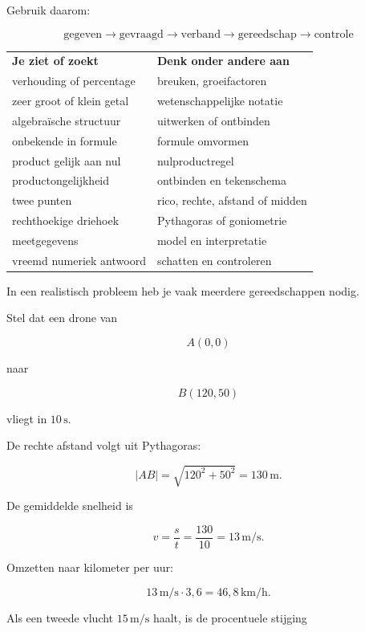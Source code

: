 \documentclass{ximera}
\begin{document}
Gebruik daarom:

\[
\boxed{
\text{gegeven}
\rightarrow
\text{gevraagd}
\rightarrow
\text{verband}
\rightarrow
\text{gereedschap}
\rightarrow
\text{controle}
}
\]


\begin{center}
\begin{tabular}{ll}
\textbf{Je ziet of zoekt} & \textbf{Denk onder andere aan}\\[2mm]
verhouding of percentage & breuken, groeifactoren\\
zeer groot of klein getal & wetenschappelijke notatie\\
algebraïsche structuur & uitwerken of ontbinden\\
onbekende in formule & formule omvormen\\
product gelijk aan nul & nulproductregel\\
productongelijkheid & ontbinden en tekenschema\\
twee punten & rico, rechte, afstand of midden\\
rechthoekige driehoek & Pythagoras of goniometrie\\
meetgegevens & model en interpretatie\\
vreemd numeriek antwoord & schatten en controleren
\end{tabular}
\end{center}



In een realistisch probleem heb je vaak meerdere gereedschappen nodig.

Stel dat een drone van

\[
A(0,0)
\]

naar

\[
B(120,50)
\]

vliegt in \(10\,\mathrm s\).

De rechte afstand volgt uit Pythagoras:

\[
|AB|
=
\sqrt{120^2+50^2}
=
130\,\mathrm m.
\]

De gemiddelde snelheid is

\[
v=\frac st
=
\frac{130}{10}
=
13\,\mathrm{m/s}.
\]

Omzetten naar kilometer per uur:

\[
13\,\mathrm{m/s}
\cdot3{,}6
=
46{,}8\,\mathrm{km/h}.
\]

Als een tweede vlucht \(15\,\mathrm{m/s}\) haalt, is de procentuele stijging
\end{document}
